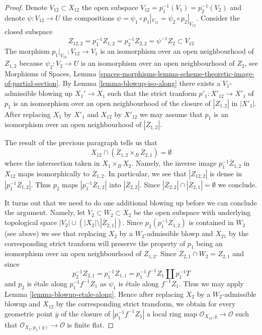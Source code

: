 \begin{proof}
\medskip\noindent
Denote $V_{12} \subset X_{12}$ the open subspace
$V_{12} = p_1^{-1}(V_1) = p_2^{-1}(V_2)$ and denote
$\psi : V_{12} \to U$ the compositions
$\psi = \psi_1 \circ p_1|_{V_{12}} = \psi_2 \circ p_2|_{V_{12}}$.
Consider the closed subspace
$$
Z_{12, 2} = p_1^{-1}Z_{1, 2} = p_2^{-1}Z_{2, 2} = \psi^{-1}Z_2
\subset V_{12}
$$
The morphism $p_1|_{V_{12}} : V_{12} \to V_1$ is an isomorphism
over an open neighbourhood of $Z_{1, 2}$ because $\psi_2 : V_2 \to U$
is an isomorphism over an open neighbourhood of $Z_2$, see
Morphisms of Spaces, Lemma
\ref{spaces-morphisms-lemma-scheme-theoretic-image-of-partial-section}.
By Lemma \ref{lemma-blowup-iso-along}
there exists a $V_1$-admissible blowing up $X_1' \to X_1$
such that the strict tranform $p'_1 : X'_{12} \to X'_1$
of $p_1$ is an isomorphism over an open neighbourhood of
the closure of $|Z_{1, 2}|$ in $|X'_1|$.
After replacing $X_1$ by $X'_1$ and $X_{12}$ by $X'_{12}$
we may assume that $p_1$ is an isomorphism over an open
neighbourhood of $|\overline{Z}_{1, 2}|$.

\medskip\noindent
The result of the previous paragraph tells us that
$$
X_{12} \cap (\overline{Z}_{1, 2} \times_B \overline{Z}_{2, 1}) = \emptyset
$$
where the intersection taken in $X_1 \times_B X_2$. Namely, the inverse
image $p_1^{-1}\overline{Z}_{1, 2}$ in $X_{12}$ maps isomorphically
to $\overline{Z}_{1, 2}$. In particular, we see that $|Z_{12, 2}|$
is dense in $|p_1^{-1}\overline{Z}_{1, 2}|$. Thus $p_2$ maps
$|p_1^{-1}\overline{Z}_{1, 2}|$ into $|\overline{Z}_{2, 2}|$.
Since $|\overline{Z}_{2, 2}| \cap |\overline{Z}_{2, 1}| = \emptyset$
we conclude.

\medskip\noindent
It turns out that we need to do one additional blowing up before we
can conclude the argument. Namely, let $V_2 \subset W_2 \subset X_2$
be the open subspace with underlying topological space
$|V_2| \cup (|X_2| \setminus |\overline{Z}_{2, 1}|)$. Since
$p_2(p_1^{-1}Z_{1, 2})$ is contained in $W_2$ (see above)
we see that replacing $X_2$ by a $W_2$-admissible blowp and $X_{21}$
by the corresponding strict tranform will preserve the property of
$p_1$ being an isomorphism over an open neighbourhood of $\overline{Z}_{1, 2}$.
Since $\overline{Z}_{2, 1} \cap W_2 = Z_{2, 1}$ and since
$$
p_2^{-1}Z_{2, 1} = p_1^{-1}Z_{1, 1} =
p_1^{-1}f^{-1}Z_1 \amalg p_1^{-1}T
$$
and $p_2$ is \'etale along $p_1^{-1}f^{-1}Z_1$ as $\psi_1$ is \'etale
along $f^{-1}Z_1$. Thus we may apply Lemma \ref{lemma-blowup-etale-along}.
Hence after replacing $X_2$ by a $W_2$-admissible blowup and $X_{12}$ by
the corresponding strict transform, we obtain for every geometric
point $\overline{y}$ of the closure of $|p_1^{-1}f^{-1}Z_1|$ a local ring map
$\mathcal{O}_{X_{12}, \overline{y}} \to \mathcal{O}$ such that
$\mathcal{O}_{X_2, p_2(\overline{y})} \to \mathcal{O}$ is finite flat.


\end{proof}
